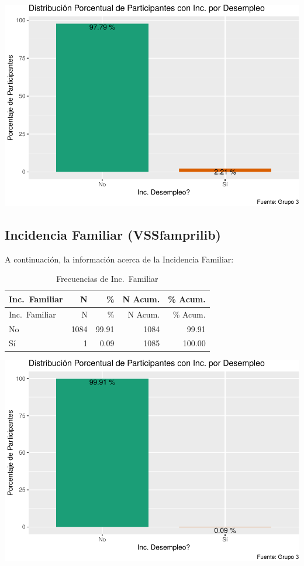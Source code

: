 \documentclass[
]{article}
\begin{document}
\includegraphics{Info_Dinix_02_files/figure-latex/30_VSSdesemp-1.pdf}

\subsection{Incidencia Familiar
(VSSfamprilib)}\label{incidencia-familiar-vssfamprilib}

A continuación, la información acerca de la Incidencia Familiar:

\begin{longtable}[]{@{}lrrrr@{}}
\caption{Frecuencias de Inc.~Familiar}\tabularnewline
\toprule\noalign{}
Inc.~Familiar & N & \% & N Acum. & \% Acum. \\
\midrule\noalign{}
\endfirsthead
\toprule\noalign{}
Inc.~Familiar & N & \% & N Acum. & \% Acum. \\
\midrule\noalign{}
\endhead
\bottomrule\noalign{}
\endlastfoot
No & 1084 & 99.91 & 1084 & 99.91 \\
Sí & 1 & 0.09 & 1085 & 100.00 \\
\end{longtable}

\includegraphics{Info_Dinix_02_files/figure-latex/30_VSSfamprilib-1.pdf}
\end{document}
